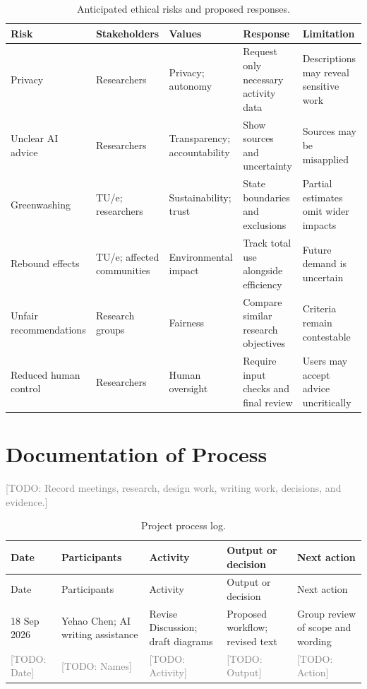 \documentclass[11pt,a4paper]{article}
\newcommand{\placeholder}[1]{\textcolor{gray}{[TODO: #1]}}
\begin{document}
\begin{table}[htbp]
\centering
\caption{Anticipated ethical risks and proposed responses.}
\label{tab:ethical-risks}
\small
\setlength{\tabcolsep}{4pt}
\begin{tabularx}{\textwidth}{@{}p{}p{}>{\raggedright\arraybackslash}X>{\raggedright\arraybackslash}X>{\raggedright\arraybackslash}X@{}}
\toprule
Risk & Stakeholders & Values & Response & Limitation \\
\midrule
Privacy & Researchers & Privacy; autonomy & Request only necessary activity data & Descriptions may reveal sensitive work \\
Unclear AI advice & Researchers & Transparency; accountability & Show sources and uncertainty & Sources may be misapplied \\
Greenwashing & TU/e; researchers & Sustainability; trust & State boundaries and exclusions & Partial estimates omit wider impacts \\
Rebound effects & TU/e; affected communities & Environmental impact & Track total use alongside efficiency & Future demand is uncertain \\
Unfair recommendations & Research groups & Fairness & Compare similar research objectives & Criteria remain contestable \\
Reduced human control & Researchers & Human oversight & Require input checks and final review & Users may accept advice uncritically \\
\bottomrule
\end{tabularx}
\end{table}

\clearpage
\nocite{*}



\appendix
\clearpage
\section{Documentation of Process}

\placeholder{Record meetings, research, design work, writing work, decisions, and evidence.}

\begin{longtable}{@{}p{}p{}p{}p{}p{}@{}}
\caption{Project process log.}\\
\toprule
Date & Participants & Activity & Output or decision & Next action \\
\midrule
\endfirsthead
\toprule
Date & Participants & Activity & Output or decision & Next action \\
\midrule
\endhead
18 Sep 2026 & Yehao Chen; AI writing assistance & Revise Discussion; draft diagrams & Proposed workflow; revised text & Group review of scope and wording \\
\placeholder{Date} & \placeholder{Names} & \placeholder{Activity} & \placeholder{Output} & \placeholder{Action} \\
\bottomrule
\end{longtable}
\end{document}
